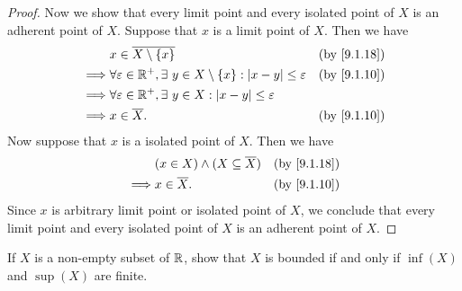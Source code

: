 \begin{proof}
  Now we show that every limit point and every isolated point of \(X\) is an adherent point of \(X\).
  Suppose that \(x\) is a limit point of \(X\).
  Then we have
  \begin{align*}
             & x \in \overline{X \setminus \{x\}}                                                            &  & \text{(by \cref{9.1.18})} \\
    \implies & \forall \varepsilon \in \R^+, \exists\ y \in X \setminus \{x\} : \abs{x - y} \leq \varepsilon &  & \text{(by \cref{9.1.10})} \\
    \implies & \forall \varepsilon \in \R^+, \exists\ y \in X : \abs{x - y} \leq \varepsilon                                                \\
    \implies & x \in \overline{X}.                                                                           &  & \text{(by \cref{9.1.10})}
  \end{align*}
  Now suppose that \(x\) is a isolated point of \(X\).
  Then we have
  \begin{align*}
             & (x \in X) \land (X \subseteq \overline{X}) &  & \text{(by \cref{9.1.18})} \\
    \implies & x \in \overline{X}.                        &  & \text{(by \cref{9.1.10})}
  \end{align*}
  Since \(x\) is arbitrary limit point or isolated point of \(X\), we conclude that every limit point and every isolated point of \(X\) is an adherent point of \(X\).
\end{proof}

\begin{ex}\label{ex:9.1.10}
  If \(X\) is a non-empty subset of \(\mathbb{R}\), show that \(X\) is bounded if and only if \(\inf(X)\) and \(\sup(X)\) are finite.
\end{ex}

